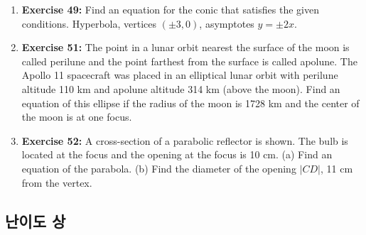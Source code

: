 \documentclass[12pt, a4paper]{article}
\begin{document}
\begin{enumerate}
    \item \textbf{Exercise 49:} Find an equation for the conic that satisfies the given conditions. Hyperbola, vertices $(\pm 3, 0)$, asymptotes $y = \pm 2x$.

    \item \textbf{Exercise 51:} The point in a lunar orbit nearest the surface of the moon is called perilune and the point farthest from the surface is called apolune. The Apollo 11 spacecraft was placed in an elliptical lunar orbit with perilune altitude 110 km and apolune altitude 314 km (above the moon). Find an equation of this ellipse if the radius of the moon is 1728 km and the center of the moon is at one focus.

    \item \textbf{Exercise 52:} A cross-section of a parabolic reflector is shown. The bulb is located at the focus and the opening at the focus is 10 cm. (a) Find an equation of the parabola. (b) Find the diameter of the opening $|CD|$, 11 cm from the vertex.
\end{enumerate}

\hrulefill
\vspace{1em}

\subsection*{난이도 상}
\end{document}
